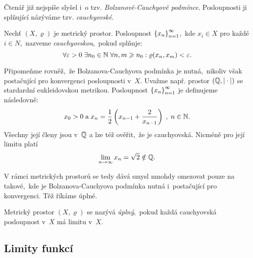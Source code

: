 Čtenář již nejspíše slyšel i~o tzv. \emph{Bolzanově-Cauchyově podmínce}. Posloupnosti ji splňující názýváme tzv. \emph{cauchyovské}.
\begin{definition}\label{def:cauchyovska-posloupnost}
    Nechť $(X,\varrho)$ je metrický prostor. Posloupnost $\left\{x_n\right\}_{n=1}^\infty$,~kde $x_i\in X$ pro každé $i\in N$,~nazveme \emph{cauchyovskou},~pokud splňuje:
    \[\forall\varepsilon>0\;\exists n_0\in\mathbb{N}\;\forall n,m\geqslant n_0:\varrho(x_n,x_m)<\varepsilon.\]
\end{definition}
Připomeňme rovněž,~že Bolzanova-Cauchyova podmínka je nutná,~nikoliv však postačující pro konvergenci posloupnosti v~$X$. Uvažme např. prostor $(\mathbb{Q},|\cdot|)$ se stardardní eukleidovskou metrikou. Posloupnost $\left\{x_n\right\}_{n=1}^\infty$ je definujeme následovně:
\[x_0>0\;\text{a}\;x_n=\dfrac{1}{2}\left(x_{n-1}+\dfrac{2}{x_{n-1}}\right)\;,\;n\in\mathbb{N}.\]
Všechny její členy jsou v~$\mathbb{Q}$ a lze též ověřit,~že je cauchyovská. Nicméně pro její limitu platí
\[\lim_{n\to\infty}x_n=\sqrt{2}\notin\mathbb{Q}.\]

V rámci metrických prostorů se tedy dává smysl mnohdy omezovat pouze na takové,~kde je Bolzanova-Cauchyova podmínka nutná i~postačující pro konvergenci. Těž říkáme úplné.
\begin{definition}\label{def:uplny-mp}
    Metrický prostor $(X,\varrho)$ se nazývá \emph{úplný},~pokud každá cauchyovská posloupnost v~$X$ má limitu v~$X$.
\end{definition}

\subsection{Limity funkcí}\label{subsec:limity-fci}

